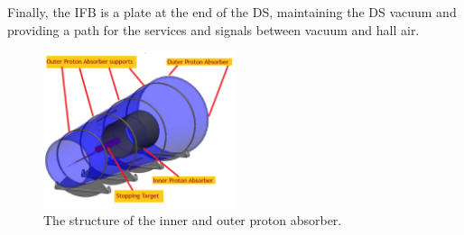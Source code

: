 Finally, the IFB is a plate 
at the end of the DS, maintaining the DS vacuum and providing a path for the services and 
signals between vacuum and hall air.

\begin{figure}[!h]
    \centering
    \includegraphics[width =0.5\textwidth]{figures/png/Screenshot_20240706_132949.png}
    \caption[The structure of the inner and outer proton absorber.]{The structure of the inner and outer proton absorber.}
    \label{fig:absorbersDS}
    \end{figure}




